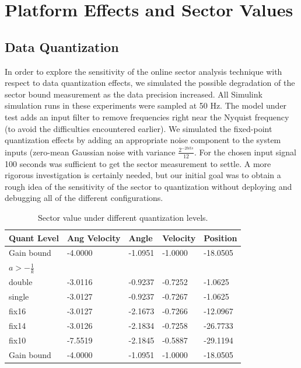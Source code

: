 \section{Platform Effects and Sector Values}
\label{section:params}

\subsection{Data Quantization}

In order to explore the sensitivity of the online sector analysis technique with respect to
data quantization effects, we simulated the possible degradation of the sector bound
measurement as the data precision increased.  All Simulink simulation runs in these
experiments were sampled 
at 50 Hz.  The model under test adds an input filter to remove frequencies right near
the Nyquist frequency (to avoid the difficulties encountered earlier).  We simulated
the fixed-point quantization effects by adding an appropriate noise component to the
system inputs (zero-mean Gaussian noise with variance $\frac{2^{-2bits}}{12}$. 
For the chosen input signal 100 seconds was sufficient to get
the sector measurement to settle.  A more rigorous investigation is certainly needed, 
but our initial goal was to obtain a rough idea of the sensitivity of the sector to 
quantization without deploying and debugging all of the different configurations.  

\begin{table}[htb]
\centering
\begin{tabular}[width=\columnwidth]{ | l | l | l | l | l | }
\hline
\textbf{Quant Level} & \textbf{Ang Velocity} & \textbf{Angle} & \textbf{Velocity} & \textbf{Position} \\
\hline \hline
Gain bound  & -4.0000 & -1.0951 & -1.0000 & -18.0505 \\
$a > -\frac{1}{k}$ & & & & \\
\hline \hline
double & -3.0116 & -0.9237 & -0.7252 & -1.0625 \\
\hline
single & -3.0127 & -0.9237 & -0.7267 & -1.0625 \\
\hline
fix16 & -3.0127 & -2.1673 & -0.7266 & -12.0967 \\
\hline
fix14 & -3.0126 & -2.1834 & -0.7258 & -26.7733 \\
\hline
fix10 & -7.5519 & -2.1845 & -0.5887 & -29.1194 \\
\hline \hline
Gain bound & -4.0000 & -1.0951 & -1.0000 & -18.0505 \\
\hline
\end{tabular}
\caption{ Sector value under different quantization levels.}
\label{tab:quant}
\end{table}

